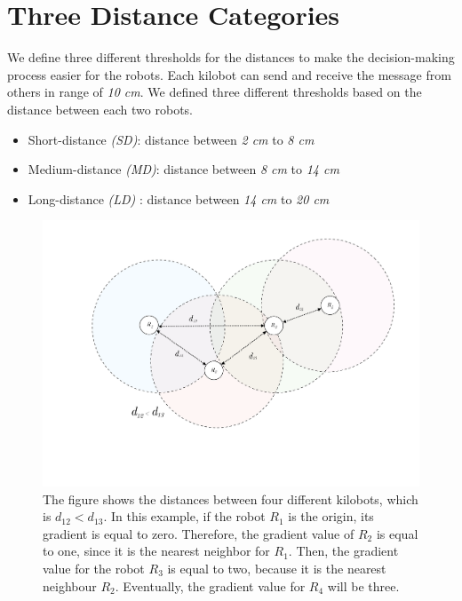 \documentclass[11pt,a4paper]{article}
\begin{document}
\section{Three Distance Categories}
We define three different thresholds for the distances to make the decision-making process easier for the robots. Each kilobot can send and receive the message from others in range of \textit{10 cm}. We defined three different thresholds based on the distance between each two robots. 

\begin{itemize}
    \item Short-distance \textit{(SD)}: distance between \textit{2 cm} to \textit{8 cm}
    \item Medium-distance \textit{(MD)}: distance between \textit{8 cm} to \textit{14 cm}
    \item Long-distance \textit{(LD)} : distance between \textit{14 cm} to \textit{20 cm}
    
\end{itemize}
 \begin{figure}[h]
     \centering
 \includegraphics[scale=0.4]{Figs/PropagationArea_BW.pdf}
     \caption{ The figure shows the distances between four different kilobots, which is \(d_{12}<d_{13}\). In this example, if the robot $R_1$ is the origin, its gradient is equal to zero.  Therefore, the gradient value of $R_2$ is equal to one, since it is the nearest neighbor for $R_1$. Then, the gradient value for the robot $R_3$ is equal to two, because it is the nearest neighbour $R_2$. Eventually, the gradient value for $R_4$ will be three.  }
     \label{fig:propagation}
  \end{figure}
\end{document}
